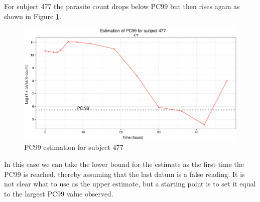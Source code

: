 For subject 477 the parasite count drops below PC99 but then rises again as shown in Figure \ref{477}.
\begin{figure}[h]
\includegraphics[width=150mm]{477.eps} 
\caption{PC99 estimation for subject 477}
\label{477}
\end{figure}
In this case we can take the lower bound for the estimate as the first time the PC99 is reached, thereby assuming that the last datum is a false reading. It is not clear what to use as the upper estimate, but a starting point is to set it equal to the largest PC99 value observed.

